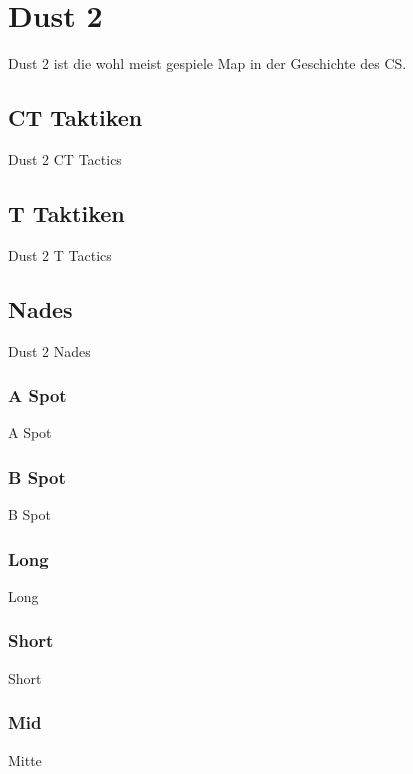 \newpage




\chapter{Dust 2}
\label{chap:dust2}
Dust 2 ist die wohl meist gespiele Map in der Geschichte des CS.

\section{CT Taktiken}
\label{sect:dust2_ct}
Dust 2 CT Tactics

\section{T Taktiken}
\label{sect:dust2_t}
Dust 2 T Tactics

\section{Nades}
\label{sect:dust2_nades}
Dust 2 Nades

\subsection{A Spot}
\label{subsect:dust2_nades_A}
A Spot

\subsection{B Spot}
\label{subsect:dust2_nades_B}
B Spot

\subsection{Long}
\label{subsect:dust2_nades_long}
Long

\subsection{Short}
\label{subsect:dust2_nades_short}
Short

\subsection{Mid}
\label{subsect:dust2_nades_mid}
Mitte
